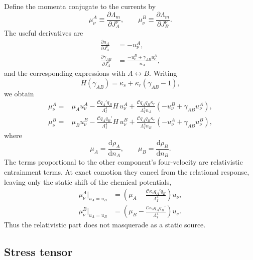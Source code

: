 \documentclass[11pt]{article}
\newcommand{\dd}{\mathrm{d}}
\begin{document}
Define the momenta conjugate to the currents by
\begin{equation}
\mu^A_\nu\equiv\frac{\partial\Lambda_m}{\partial J_A^\nu},
\qquad
\mu^B_\nu\equiv\frac{\partial\Lambda_m}{\partial J_B^\nu}.
\label{eq:momdef}
\end{equation}
The useful derivatives are
\begin{align}
\frac{\partial n_A}{\partial J_A^\nu}&=-u^A_\nu,
\label{eq:dnDeriv}\\
\frac{\partial\gamma_{AB}}{\partial J_A^\nu}
&=\frac{-u^B_\nu+\gamma_{AB}u^A_\nu}{n_A},
\label{eq:dgDeriv}
\end{align}
and the corresponding expressions with $A\leftrightarrow B$.  Writing
\begin{equation}
H(\gamma_{AB})
=\kappa_s+\kappa_r(\gamma_{AB}-1),
\label{eq:Hdef}
\end{equation}
we obtain
\begin{align}
\mu^A_\nu
={}&\mu_Au^A_\nu
-\frac{\mathcal C q_A' q_B}{\Lambda_I^4}H\,u^A_\nu
+\frac{\mathcal C q_Aq_B\kappa_r}{\Lambda_I^4n_A}
\left(-u^B_\nu+\gamma_{AB}u^A_\nu\right),
\label{eq:momA}\\
\mu^B_\nu
={}&\mu_Bu^B_\nu
-\frac{\mathcal C q_A q_B'}{\Lambda_I^4}H\,u^B_\nu
+\frac{\mathcal C q_Aq_B\kappa_r}{\Lambda_I^4n_B}
\left(-u^A_\nu+\gamma_{AB}u^B_\nu\right),
\label{eq:momB}
\end{align}
where
\begin{equation}
\mu_A=\frac{\dd\rho_A}{\dd n_A},
\qquad
\mu_B=\frac{\dd\rho_B}{\dd n_B}.
\label{eq:chemPot}
\end{equation}
The terms proportional to the other component's four-velocity are relativistic entrainment terms.  At exact comotion they cancel from the relational response, leaving only the static shift of the chemical potentials,
\begin{align}
\mu^A_\nu\big|_{u_A=u_B}
&=\left(\mu_A-\frac{\mathcal C\kappa_s q_A'q_B}{\Lambda_I^4}\right)u_\nu,
\label{eq:momAcomoving}\\
\mu^B_\nu\big|_{u_A=u_B}
&=\left(\mu_B-\frac{\mathcal C\kappa_s q_Aq_B'}{\Lambda_I^4}\right)u_\nu.
\label{eq:momBcomoving}
\end{align}
Thus the relativistic part does not masquerade as a static source.

\subsection{Stress tensor}
\end{document}
